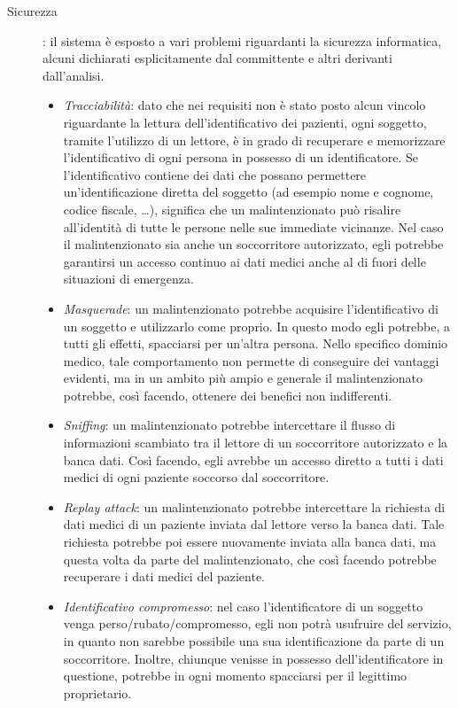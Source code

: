 \documentclass[a4paper,12pt]{report}
\begin{document}
\begin{description}
	\item[Sicurezza]: il sistema è esposto a vari problemi riguardanti la sicurezza informatica, alcuni dichiarati esplicitamente dal committente e altri derivanti dall'analisi. 
	\begin{itemize}
		\item \emph{Tracciabilità}: dato che nei requisiti non è stato posto alcun vincolo riguardante la lettura dell'identificativo dei pazienti, ogni soggetto, tramite l'utilizzo di un lettore, è in grado di recuperare e memorizzare l'identificativo di ogni persona in possesso di un identificatore. Se l'identificativo contiene dei dati che possano permettere un'identificazione diretta del soggetto (ad esempio nome e cognome, codice fiscale, \dots), significa che un malintenzionato può risalire all'identità di tutte le persone nelle sue immediate vicinanze. Nel caso il malintenzionato sia anche un soccorritore autorizzato, egli potrebbe garantirsi un accesso continuo ai dati medici anche al di fuori delle situazioni di emergenza.
		\item \emph{Masquerade}: un malintenzionato potrebbe acquisire l'identificativo di un soggetto e utilizzarlo come proprio. In questo modo egli potrebbe, a tutti gli effetti, spacciarsi per un'altra persona. Nello specifico dominio medico, tale comportamento non permette di conseguire dei vantaggi evidenti, ma in un ambito più ampio e generale il malintenzionato potrebbe, così facendo, ottenere dei benefici non indifferenti. 
		\item \emph{Sniffing}: un malintenzionato potrebbe intercettare il flusso di informazioni scambiato tra il lettore di un soccorritore autorizzato e la banca dati. Così facendo, egli avrebbe un accesso diretto a tutti i dati medici di ogni paziente soccorso dal soccorritore.
		\item \emph{Replay attack}: un malintenzionato potrebbe intercettare la richiesta di dati medici di un paziente inviata dal lettore verso la banca dati. Tale richiesta potrebbe poi essere nuovamente inviata alla banca dati, ma questa volta da parte del malintenzionato, che così facendo potrebbe recuperare i dati medici del paziente.
		\item \emph{Identificativo compromesso}: nel caso l'identificatore di un soggetto venga perso/rubato/compromesso, egli non potrà usufruire del servizio, in quanto non sarebbe possibile una sua identificazione da parte di un soccorritore. Inoltre, chiunque venisse in possesso dell'identificatore in questione, potrebbe in ogni momento spacciarsi per il legittimo proprietario.

\end{itemize}
\end{description}
\end{document}
